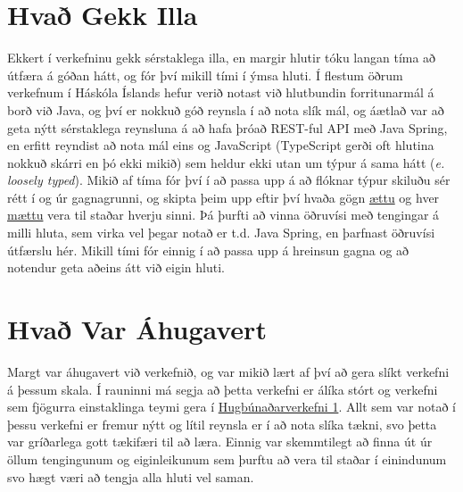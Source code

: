 \documentclass[a4paper,11pt]{article}\usepackage[pdftex]{graphicx}\usepackage[]{xcolor}
\begin{document}
\section{Hvað Gekk Illa}
Ekkert í verkefninu gekk sérstaklega illa, en margir hlutir tóku langan tíma að útfæra á góðan hátt, og fór því mikill tími í ýmsa hluti. Í flestum öðrum verkefnum í Háskóla Íslands hefur verið notast við hlutbundin forritunarmál á borð við Java, og því er nokkuð góð reynsla í að nota slík mál, og áætlað var að geta nýtt sérstaklega reynsluna á að hafa þróað REST-ful API með Java Spring, en erfitt reyndist að nota mál eins og JavaScript (TypeScript gerði oft hlutina nokkuð skárri en þó ekki mikið) sem heldur ekki utan um týpur á sama hátt (\textit{e. loosely typed}). Mikið af tíma fór því í að passa upp á að flóknar týpur skiluðu sér rétt í og úr gagnagrunni, og skipta þeim upp eftir því hvaða gögn \underline{ættu} og hver \underline{mættu} vera til staðar hverju sinni. Þá þurfti að vinna öðruvísi með tengingar á milli hluta, sem virka vel þegar notað er t.d. Java Spring, en þarfnast öðruvísi útfærslu hér. Mikill tími fór einnig í að passa upp á hreinsun gagna og að notendur geta aðeins átt við eigin hluti. 

\section{Hvað Var Áhugavert}
Margt var áhugavert við verkefnið, og var mikið lært af því að gera slíkt verkefni á þessum skala. Í rauninni má segja að þetta verkefni er álíka stórt og verkefni sem fjögurra einstaklinga teymi gera í \href{https://ugla.hi.is/kennsluskra/index.php?tab=nam&chapter=namskeid&id=08715120246}{Hugbúnaðarverkefni 1}. Allt sem var notað í þessu verkefni er fremur nýtt og lítil reynsla er í að nota slíka tækni, svo þetta var gríðarlega gott tækifæri til að læra. Einnig var skemmtilegt að finna út úr öllum tengingunum og eiginleikunum sem þurftu að vera til staðar í einindunum svo hægt væri að tengja alla hluti vel saman.
\end{document}

